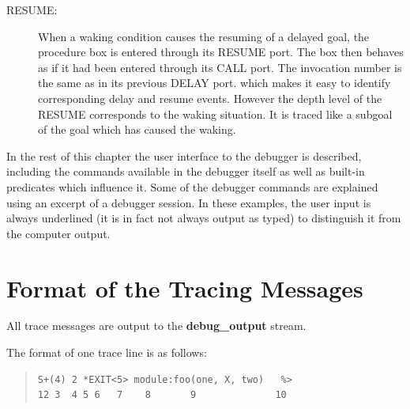 \begin{description}
\item[RESUME:] When a waking condition causes the resuming of
a delayed goal, the procedure box is entered through its RESUME
port.  The box then behaves as if it had been entered through its CALL
port.  The invocation number is the same as in its previous DELAY port.
which makes it easy to identify corresponding delay and resume events.
However the depth level of the RESUME corresponds to the waking situation.
It is traced like a subgoal of the goal which has caused the waking.

\end{description}

In the rest of this chapter the user interface to the debugger is
described, including the commands available in the debugger itself as
well as built-in predicates which influence it.  Some of the debugger
commands are explained using an excerpt of a debugger session.  In
these examples, the user input is always underlined (it is in fact
not always output as typed) to distinguish it from the computer output.

\section{Format of the Tracing Messages}
All trace messages are output to the
{\bf debug_output} stream.

The format of one trace line is as follows:
\begin{quote}
\begin{verbatim}
S+(4) 2 *EXIT<5> module:foo(one, X, two)   %>
12 3  4 5 6   7    8       9              10
\end{verbatim}
\end{quote}

